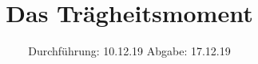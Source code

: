 

\subject{V101}
\title{Das Trägheitsmoment}
\date{%
  Durchführung: 10.12.19
  \hspace{3em}
  Abgabe: 17.12.19
}



\maketitle
\thispagestyle{empty}
\tableofcontents
\newpage







\printbibliography{}


